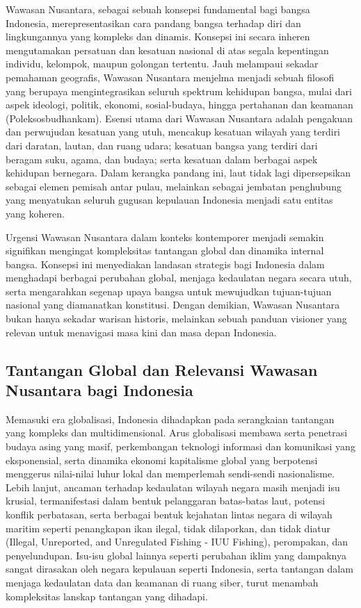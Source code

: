 \documentclass[12pt, a4paper]{article}
\begin{document}
Wawasan Nusantara, sebagai sebuah konsepsi fundamental bagi bangsa Indonesia, merepresentasikan cara pandang bangsa terhadap diri dan lingkungannya yang kompleks dan dinamis. Konsepsi ini secara inheren mengutamakan persatuan dan kesatuan nasional di atas segala kepentingan individu, kelompok, maupun golongan tertentu. Jauh melampaui sekadar pemahaman geografis, Wawasan Nusantara menjelma menjadi sebuah filosofi yang berupaya mengintegrasikan seluruh spektrum kehidupan bangsa, mulai dari aspek ideologi, politik, ekonomi, sosial-budaya, hingga pertahanan dan keamanan (Poleksosbudhankam). Esensi utama dari Wawasan Nusantara adalah pengakuan dan perwujudan kesatuan yang utuh, mencakup kesatuan wilayah yang terdiri dari daratan, lautan, dan ruang udara; kesatuan bangsa yang terdiri dari beragam suku, agama, dan budaya; serta kesatuan dalam berbagai aspek kehidupan bernegara. Dalam kerangka pandang ini, laut tidak lagi dipersepsikan sebagai elemen pemisah antar pulau, melainkan sebagai jembatan penghubung yang menyatukan seluruh gugusan kepulauan Indonesia menjadi satu entitas yang koheren.  

Urgensi Wawasan Nusantara dalam konteks kontemporer menjadi semakin signifikan mengingat kompleksitas tantangan global dan dinamika internal bangsa. Konsepsi ini menyediakan landasan strategis bagi Indonesia dalam menghadapi berbagai perubahan global, menjaga kedaulatan negara secara utuh, serta mengarahkan segenap upaya bangsa untuk mewujudkan tujuan-tujuan nasional yang diamanatkan konstitusi. Dengan demikian, Wawasan Nusantara bukan hanya sekadar warisan historis, melainkan sebuah panduan visioner yang relevan untuk menavigasi masa kini dan masa depan Indonesia.  

\subsection*{Tantangan Global dan Relevansi Wawasan Nusantara bagi Indonesia}

Memasuki era globalisasi, Indonesia dihadapkan pada serangkaian tantangan yang kompleks dan multidimensional. Arus globalisasi membawa serta penetrasi budaya asing yang masif, perkembangan teknologi informasi dan komunikasi yang eksponensial, serta dinamika ekonomi kapitalisme global yang berpotensi menggerus nilai-nilai luhur lokal dan memperlemah sendi-sendi nasionalisme. Lebih lanjut, ancaman terhadap kedaulatan wilayah negara masih menjadi isu krusial, termanifestasi dalam bentuk pelanggaran batas-batas laut, potensi konflik perbatasan, serta berbagai bentuk kejahatan lintas negara di wilayah maritim seperti penangkapan ikan ilegal, tidak dilaporkan, dan tidak diatur (Illegal, Unreported, and Unregulated Fishing - IUU Fishing), perompakan, dan penyelundupan. Isu-isu global lainnya seperti perubahan iklim yang dampaknya sangat dirasakan oleh negara kepulauan seperti Indonesia, serta tantangan dalam menjaga kedaulatan data dan keamanan di ruang siber, turut menambah kompleksitas lanskap tantangan yang dihadapi.  
\end{document}

